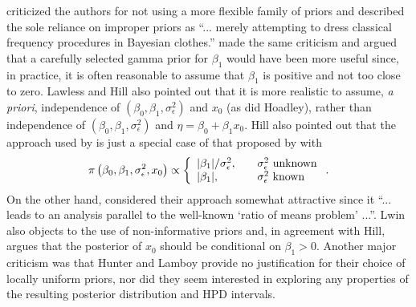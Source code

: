 \documentclass[cmfont,usenames,dvipsnames,leqno]{afit-etd}\usepackage[]{graphicx}\usepackage[]{color}
\begin{document}
\citet{lawless_discussion_1981} criticized the authors for not using a more flexible family of priors and described the sole reliance on improper priors as ``... merely attempting to dress classical frequency procedures in Bayesian clothes.'' \citet{hill_discussion_1981} made the same criticism and argued that a carefully selected gamma prior for $\beta_1$ would have been more useful since, in practice, it is often reasonable to assume that $\beta_1$ is positive and not too close to zero. Lawless and Hill also pointed out that it is more realistic to assume, \textit{a priori}, independence of $(\beta_0, \beta_1, \sigma_\epsilon^2)$ and $x_0$ (as did Hoadley), rather than independence of $(\beta_0, \beta_1, \sigma_\epsilon^2)$ and $\eta = \beta_0 + \beta_1 x_0$. Hill also pointed out that the approach used by \citet{hunter_bayesian_1981} is just a special case of that proposed by \citet{hoadley_bayesian_1970} with 
\begin{equation*}
  \pi\left(\beta_0, \beta_1, \sigma_\epsilon^2, x_0\right) \propto \left\{ \begin{array}{l l}
                                                         |\beta_1|/\sigma_\epsilon^2, & \quad \text{$\sigma_\epsilon^2$ unknown} \\
                                                         |\beta_1|,          & \quad \text{$\sigma_\epsilon^2$ known}
                                                       \end{array} \right..
\end{equation*}
On the other hand, \citet{lwin_discussion_1981} considered their approach somewhat attractive since it ``... leads to an analysis parallel to the well-known `ratio of means problem' ...''. Lwin also objects to the use of non-informative priors and, in agreement with Hill, argues that the posterior of $x_0$ should be conditional on $\beta_1 > 0$. Another major criticism was that Hunter and Lamboy provide no justification for their choice of locally uniform priors, nor did they seem interested in exploring any properties of the resulting posterior distribution and HPD intervals. 
\end{document}
